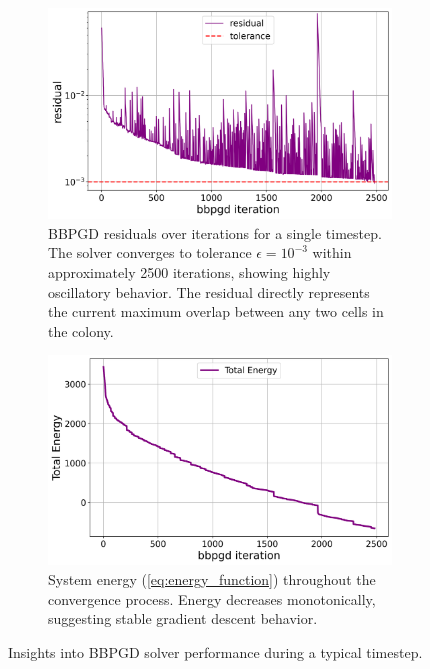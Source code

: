 \documentclass[conference]{IEEEtran}
\begin{document}
\begin{figure}[H]
    \centering
    \begin{subfigure}[b]{\linewidth}
        \centering
        \includegraphics[width=\linewidth]{figures/comparison_plots/bbpgd_residual.png}
        \caption{BBPGD residuals over iterations for a single timestep. The solver converges to tolerance $\epsilon = 10^{-3}$ within approximately 2500 iterations, showing highly oscillatory behavior. The residual directly represents the current maximum overlap between any two cells in the colony.}
        \label{fig:bbpgd_residual}
    \end{subfigure}

    \begin{subfigure}[b]{\linewidth}
        \centering
        \includegraphics[width=\linewidth]{figures/comparison_plots/bbpgd_total_energy.png}
        \caption{System energy (\autoref{eq:energy_function}) throughout the convergence process. Energy decreases monotonically, suggesting stable gradient descent behavior.}
        \label{fig:bbpgd_energy}
    \end{subfigure}

    \caption{Insights into BBPGD solver performance during a typical timestep.}
    \label{fig:bbpgd_analysis}
\end{figure}
\end{document}
